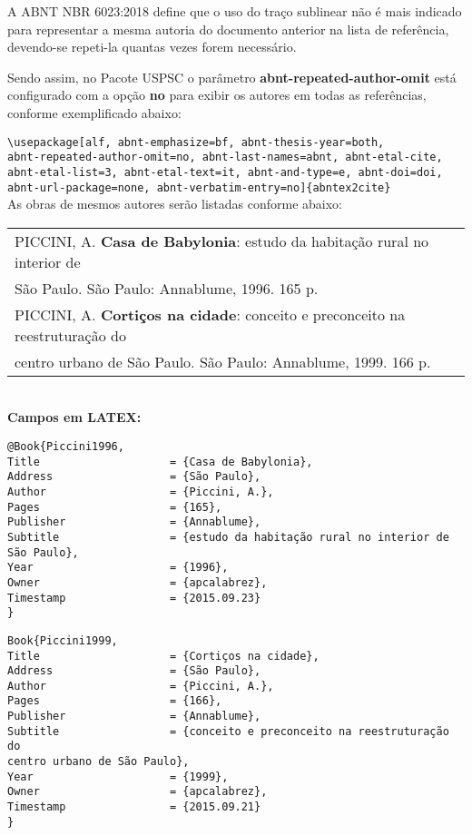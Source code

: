 A ABNT NBR 6023:2018 define que o uso do traço sublinear não é mais indicado para representar a mesma autoria do documento anterior na lista de referência, devendo-se repeti-la quantas vezes forem necessário.

Sendo assim, no Pacote USPSC o parâmetro \textbf{abnt-repeated-author-omit} está configurado com a opção \textbf{no} para exibir os autores em todas as referências, conforme exemplificado abaixo: 

\verb+\usepackage[alf, abnt-emphasize=bf, abnt-thesis-year=both, + \\ \verb+abnt-repeated-author-omit=no, abnt-last-names=abnt, abnt-etal-cite,+ \\
\verb+abnt-etal-list=3, abnt-etal-text=it, abnt-and-type=e, abnt-doi=doi,+ \\ \verb+abnt-url-package=none, abnt-verbatim-entry=no]{abntex2cite}+ \\

As obras de mesmos autores serão listadas conforme abaixo: \\

\begin{tabular}{|l|c|} \hline
	PICCINI, A. \textbf{Casa de Babylonia}: estudo da habitação rural no interior de \\São Paulo. São Paulo: Annablume, 1996. 165 p. \\
	
	PICCINI, A. \textbf{Cortiços na cidade}: conceito e preconceito na reestruturação do \\centro urbano de  São Paulo. São Paulo: Annablume, 1999. 166 p.   \\\hline
\end{tabular}\\

\textbf{Campos em LATEX:}

\begin{verbatim}
@Book{Piccini1996,
Title                    = {Casa de Babylonia},
Address                  = {São Paulo},
Author                   = {Piccini, A.},
Pages                    = {165},
Publisher                = {Annablume},
Subtitle                 = {estudo da habitação rural no interior de 
São Paulo},
Year                     = {1996},
Owner                    = {apcalabrez},
Timestamp                = {2015.09.23}
}
\end{verbatim}

\begin{verbatim}
Book{Piccini1999,
Title                    = {Cortiços na cidade},
Address                  = {São Paulo},
Author                   = {Piccini, A.},
Pages                    = {166},
Publisher                = {Annablume},
Subtitle                 = {conceito e preconceito na reestruturação do 
centro urbano de São Paulo},
Year                     = {1999},
Owner                    = {apcalabrez},
Timestamp                = {2015.09.21}
}
\end{verbatim}


